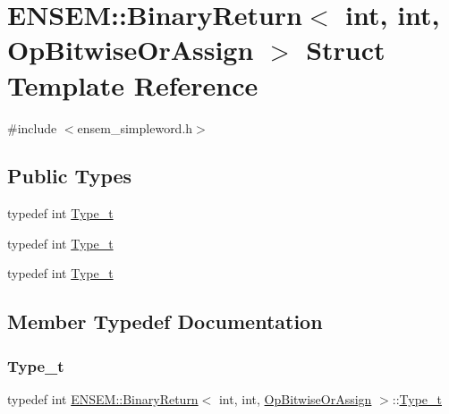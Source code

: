 \hypertarget{structENSEM_1_1BinaryReturn_3_01int_00_01int_00_01OpBitwiseOrAssign_01_4}{}\section{E\+N\+S\+EM\+:\+:Binary\+Return$<$ int, int, Op\+Bitwise\+Or\+Assign $>$ Struct Template Reference}
\label{structENSEM_1_1BinaryReturn_3_01int_00_01int_00_01OpBitwiseOrAssign_01_4}


{\ttfamily \#include $<$ensem\+\_\+simpleword.\+h$>$}

\subsection*{Public Types}
\begin{DoxyCompactItemize}
\item 
typedef int \mbox{\hyperlink{structENSEM_1_1BinaryReturn_3_01int_00_01int_00_01OpBitwiseOrAssign_01_4_a39b11e165103fedd3dd7ec8e4ef89d93}{Type\+\_\+t}}
\item 
typedef int \mbox{\hyperlink{structENSEM_1_1BinaryReturn_3_01int_00_01int_00_01OpBitwiseOrAssign_01_4_a39b11e165103fedd3dd7ec8e4ef89d93}{Type\+\_\+t}}
\item 
typedef int \mbox{\hyperlink{structENSEM_1_1BinaryReturn_3_01int_00_01int_00_01OpBitwiseOrAssign_01_4_a39b11e165103fedd3dd7ec8e4ef89d93}{Type\+\_\+t}}
\end{DoxyCompactItemize}


\subsection{Member Typedef Documentation}
\mbox{\label{structENSEM_1_1BinaryReturn_3_01int_00_01int_00_01OpBitwiseOrAssign_01_4_a39b11e165103fedd3dd7ec8e4ef89d93}} 
\subsubsection{\texorpdfstring{Type\_t}{Type\_t}\hspace{0.1cm}{\footnotesize\ttfamily [1/3]}}
{\footnotesize\ttfamily typedef int \mbox{\hyperlink{structENSEM_1_1BinaryReturn}{E\+N\+S\+E\+M\+::\+Binary\+Return}}$<$ int, int, \mbox{\hyperlink{structENSEM_1_1OpBitwiseOrAssign}{Op\+Bitwise\+Or\+Assign}} $>$\+::\mbox{\hyperlink{structENSEM_1_1BinaryReturn_3_01int_00_01int_00_01OpBitwiseOrAssign_01_4_a39b11e165103fedd3dd7ec8e4ef89d93}{Type\+\_\+t}}}

